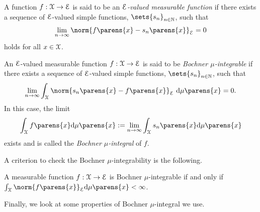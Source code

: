 \begin{definition}\label{def-measurable-fun}
	A function $f: \mathcal{X} \to \mathcal{E}$ is said to be an \textit{$\mathcal{E}$-valued measurable function} if there exists a sequence of $\mathcal{E}$-valued simple functions, $\sets{s_n}_{n \in \Natural}$, such that
	\begin{align}
		\lim_{n \to \infty} \norm{f \parens{x} - s_n \parens{x}}_{\calE} = 0
	\end{align}
	holds for all $x \in \mathcal{X}$. 
\end{definition}

\begin{definition}\label{def-bochner-integral}
	An $\mathcal{E}$-valued measurable function $f: \mathcal{X} \to \mathcal{E}$ is said to be \textit{Bochner $\mu$-integrable} if there exists a sequence of $\mathcal{E}$-valued simple functions, $\sets{s_n}_{n \in \Natural}$, such that
	\begin{align}
		\lim_{n \to \infty} \int_{\calX} \norm{s_n \parens{x} - f \parens{x}}_{\calE} \ \diff \mu \parens{x} = 0. 
	\end{align}
	In this case, the limit
	\begin{align*}
		\int_{\calX} f \parens{x} \diff \mu \parens{x} := \lim_{n \to \infty} \int_{\calX} s_n \parens{x} \diff \mu \parens{x}
	\end{align*}
	exists and is called the \textit{Bochner $\mu$-integral} of $f$. 
\end{definition}

A criterion to check the Bochner $\mu$-integrability is the following. 

\begin{proposition}\label{prop-bochner-integrability}
	A measurable function $f: \mathcal{X} \to \mathcal{E}$ is Bochner $\mu$-integrable if and only if $\int_{\calX} \norm{f \parens{x}}_{\calE} \diff \mu \parens{x} < \infty$. 
\end{proposition}

Finally, we look at some properties of Bochner $\mu$-integral we use. 

